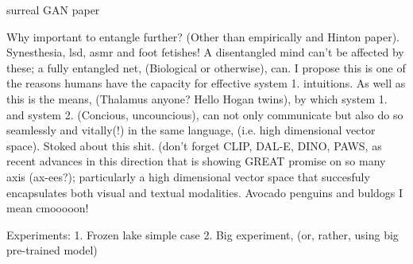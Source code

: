 surreal GAN paper

Why important to entangle further? (Other than empirically and Hinton paper). Synesthesia, lsd, asmr and foot fetishes! A disentangled mind can't be affected by these; a fully entangled net, (Biological or otherwise), can. I propose this is one of the reasons humans have the capacity for effective system 1. intuitions. As well as this is the means, (Thalamus anyone? Hello Hogan twins), by which system 1. and system 2. (Concious, uncouncious), can not only communicate but also do so seamlessly and vitally(!) in the same language, (i.e. high dimensional vector space). Stoked about this shit. (don't forget CLIP, DAL-E, DINO, PAWS, as recent advances in this direction that is showing GREAT promise on so many axis (ax-ees?); particularly a high dimensional vector space that succesfuly encapsulates both visual and textual modalities. Avocado penguins and buldogs I mean cmooooon! 

Experiments:
1. Frozen lake simple case
2. Big experiment, (or, rather, using big pre-trained model)

